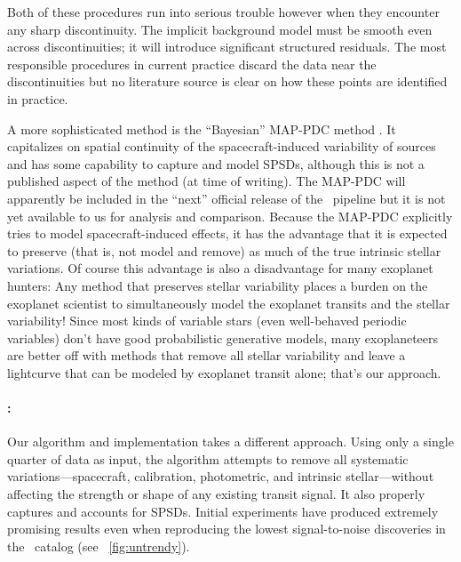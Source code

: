 \documentclass[letterpaper,12pt,preprint]{hack_aastex}
\newcommand{\Untrendy}{\package{Untrendy}}
\begin{document}
Both of these procedures run into serious trouble however when they encounter
any sharp discontinuity.
The implicit background model must be smooth even across discontinuities; it
will introduce significant structured residuals.
The most responsible procedures in current practice discard the data
near the discontinuities but no literature source is clear on how these points
are identified in practice.

A more sophisticated method is the ``Bayesian'' MAP-PDC method
\citep{map-pdc1,map-pdc2}.
It capitalizes on spatial
continuity of the spacecraft-induced variability of sources and
has some capability to capture and model SPSDs, although this is not
a published aspect of the method (at time of writing).
The MAP-PDC will apparently be included in the ``next'' official release of the
\Kepler\ pipeline but it is not yet available to us for analysis and comparison.
Because the MAP-PDC explicitly tries to model spacecraft-induced effects, it
has the advantage that it is expected to preserve (that is, not model and
remove) as much of the true intrinsic stellar variations.
Of course this advantage is also a disadvantage for many exoplanet hunters:
Any method that preserves stellar variability places a burden on the exoplanet
scientist to simultaneously model the exoplanet transits and the stellar
variability!
Since most kinds of variable stars (even well-behaved periodic variables)
don't have good probabilistic generative models, many exoplaneteers are better
off with methods that remove all stellar variability and leave a lightcurve
that can be modeled by exoplanet transit alone; that's our approach.

\paragraph{\Untrendy:}
Our algorithm and implementation takes a
different approach.
Using only a single quarter of data as input, the algorithm attempts to
remove all systematic variations---spacecraft, calibration, photometric, and
intrinsic stellar---without affecting the strength or shape of any existing
transit signal.
It also properly captures and accounts for SPSDs.
Initial experiments have produced extremely promising results even when
reproducing the lowest signal-to-noise discoveries in the \Kepler\ catalog
(see \figurename~\ref{fig:untrendy}).
\end{document}
